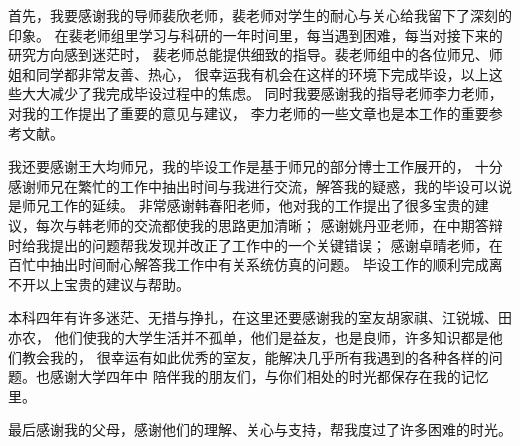 
\begin{acknowledgements}
首先，我要感谢我的导师裴欣老师，裴老师对学生的耐心与关心给我留下了深刻的印象。
在裴老师组里学习与科研的一年时间里，每当遇到困难，每当对接下来的研究方向感到迷茫时，
裴老师总能提供细致的指导。裴老师组中的各位师兄、师姐和同学都非常友善、热心，
很幸运我有机会在这样的环境下完成毕设，以上这些大大减少了我完成毕设过程中的焦虑。
同时我要感谢我的指导老师李力老师，对我的工作提出了重要的意见与建议，
李力老师的一些文章也是本工作的重要参考文献。

我还要感谢王大均师兄，我的毕设工作是基于师兄的部分博士工作展开的，
十分感谢师兄在繁忙的工作中抽出时间与我进行交流，解答我的疑惑，我的毕设可以说是师兄工作的延续。
非常感谢韩春阳老师，他对我的工作提出了很多宝贵的建议，每次与韩老师的交流都使我的思路更加清晰；
感谢姚丹亚老师，在中期答辩时给我提出的问题帮我发现并改正了工作中的一个关键错误；
感谢卓晴老师，在百忙中抽出时间耐心解答我工作中有关系统仿真的问题。
毕设工作的顺利完成离不开以上宝贵的建议与帮助。

本科四年有许多迷茫、无措与挣扎，在这里还要感谢我的室友胡家祺、江锐城、田亦农，
他们使我的大学生活并不孤单，他们是益友，也是良师，许多知识都是他们教会我的，
很幸运有如此优秀的室友，能解决几乎所有我遇到的各种各样的问题。也感谢大学四年中
陪伴我的朋友们，与你们相处的时光都保存在我的记忆里。

最后感谢我的父母，感谢他们的理解、关心与支持，帮我度过了许多困难的时光。
\end{acknowledgements}

